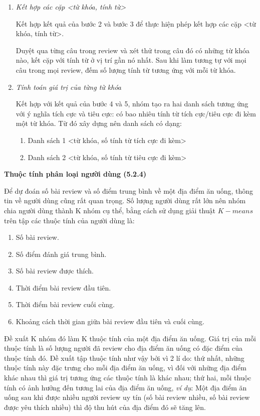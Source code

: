 \documentclass[12pt]{extarticle}
\begin{document}
\begin{enumerate}
					\item \textit{Kết hợp các cặp <từ khóa, tính từ>}
						\par Kết hợp kết quả của bước 2 và bước 3 để thực hiện phép kết hợp các cặp <từ khóa, tính từ>. 	
						\par Duyệt qua từng câu trong review và xét thử trong câu đó có những từ khóa nào, kết cặp với tính từ ở vị trí gần nó nhất. Sau khi làm tương tự với mọi câu trong mọi review, đếm số lượng tính từ tương ứng với mỗi từ khóa.
					\item \textit{Tính toán giá trị của từng từ khóa}
						\par Kết hợp với kết quả của bước 4 và 5, nhóm tạo ra hai danh sách tương ứng với ý nghĩa tích cực và tiêu cực: có bao nhiêu tính từ tích cực/tiêu cực đi kèm một từ khóa. Từ đó xây dựng nên danh sách có dạng:
						\begin{enumerate}
							\item Danh sách 1 <từ khóa, số tính từ tích cực đi kèm>
							\item Danh sách 2 <từ khóa, số tính từ tiêu cực đi kèm>
						\end{enumerate}
				\end{enumerate}
			\par \textbf{Thuộc tính phân loại người dùng (5.2.4)}
				\par Để dự đoán số bài review và số điểm trung bình về một địa điểm ăn uống, thông tin về người dùng cũng rất quan trọng. Số lượng người dùng rất lớn nên nhóm chia người dùng thành K nhóm cụ thể, bằng cách sử dụng giải thuật $K-means$ trên tập các thuộc tính của người dùng là:
				\begin{enumerate}
					\item Số bài review.
					\item Số điểm đánh giá trung bình.
					\item Số bài review được thích.
					\item Thời điểm bài review đầu tiên.
					\item Thời điểm bài review cuối cùng.
					\item Khoảng cách thời gian giữa bài review đầu tiên và cuối cùng.
				\end{enumerate}
				\par Đề xuất K nhóm đó làm K thuộc tính của một địa điểm ăn uống. Giá trị của mỗi thuộc tính là số lượng người đã review cho địa điểm ăn uống có đặc điểm của thuộc tính đó. Đề xuất tập thuộc tính như vậy bởi vì 2 lí do: thứ nhất, những thuộc tính này đặc trưng cho mỗi địa điểm ăn uống, vì đối với những địa điểm khác nhau thì giá trị tương ứng các thuộc tính là khác nhau; thứ hai, mỗi thuộc tính có ảnh hưởng đến tương lai của địa điểm ăn uống, \textit{ví dụ}: Một địa điểm ăn uống sau khi được nhiều người review uy tín (số bài review nhiều, số bài review được yêu thích nhiều) thì độ thu hút của địa điểm đó sẽ tăng lên.  
\end{document}

